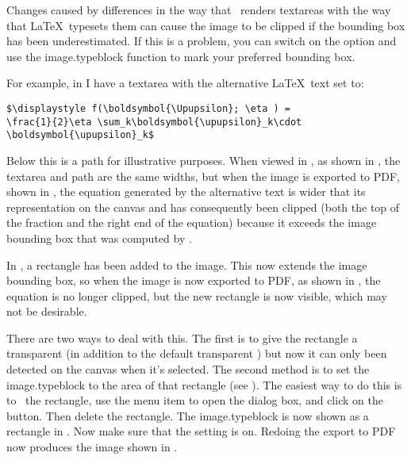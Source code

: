 \begin{warning}
Changes caused by differences in the way that \FlowframTk\ renders
\glspl{textarea} with the way that \LaTeX\ typesets them
can cause the image to be clipped if the bounding box
has been underestimated. If this is a problem, you can switch on
the 
option and use the \gls{image.typeblock} function to mark your
preferred bounding box.
\end{warning}

For example, in  I have a \gls{textarea} with the
alternative \LaTeX\ text set to:
\begin{verbatim}
$\displaystyle f(\boldsymbol{\Upupsilon}; \eta ) = 
\frac{1}{2}\eta \sum_k\boldsymbol{\upupsilon}_k\cdot 
\boldsymbol{\upupsilon}_k$
\end{verbatim}
Below this is a \gls{path} for illustrative purposes. When viewed in
\FlowframTk, as shown in , the
\gls*{textarea} and \gls*{path} are the same widths, but when the
image is exported to PDF, shown in , the
equation generated by the alternative text is wider that its
representation on the \gls{canvas} and has consequently been clipped
(both the top of the fraction and the right end of the equation)
because it exceeds the image bounding box that was computed by
\FlowframTk.

In , a rectangle has been
added to the image. This now extends the image bounding box, so when
the image is now exported to PDF, as shown in
, the equation is no longer clipped,
but the new rectangle is now visible, which may not be desirable.

There are two ways to deal with this. The first is to give the
rectangle a \gls{transparent}  (in addition to the
default \gls{transparent} ) but now it can only been detected on the
\gls{canvas} when it's selected. The second method is to set the
\gls{image.typeblock} to the area of that rectangle (see ).
The easiest way to do this is to \select\ the rectangle, use the
 menu item to open the
 dialog box, and click on the
 button. Then delete the
rectangle. The \gls{image.typeblock} is now shown as a  rectangle in
. Now make sure that the
setting is on. Redoing the export to PDF now
produces the image shown in .

